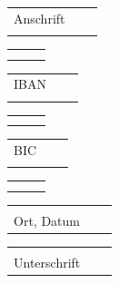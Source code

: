 \documentclass[parskip=half]{scrreprt}
\begin{document}
\begin{tabular}{p{4cm}p{.5cm}l}
\hspace*{10mm} Anschrift \\ \\
\end{tabular}
\begin{tabular}{p{13cm}p{.5cm}l}
\dotfill \\ \\
\end{tabular}

\begin{tabular}{p{4cm}p{.5cm}l}
\hspace*{10mm} IBAN \\ \\
\end{tabular}
\begin{tabular}{p{13cm}p{.5cm}l}
\dotfill \\ \\
\end{tabular}

\begin{tabular}{p{4cm}p{.5cm}l}
\hspace*{10mm} BIC \\ \\
\end{tabular}
\begin{tabular}{p{8cm}p{.5cm}l}
\dotfill \\ \\
\end{tabular}


\vspace{1,5 cm}
\begin{tabular}{p{7cm}p{.5cm}l}
\dotfill \\
Ort, Datum
\end{tabular}
\hfill
\begin{tabular}{p{7cm}p{.5cm}l}

\dotfill \\
Unterschrift
\end{tabular}
\end{document}
